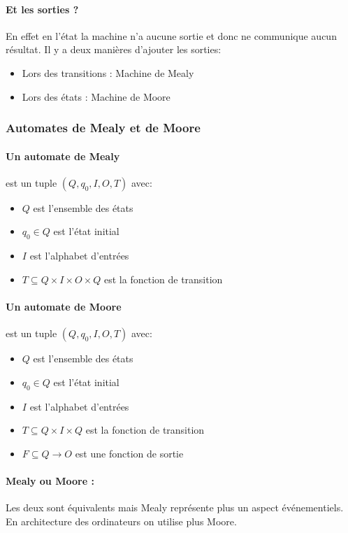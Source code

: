 \documentclass[10pt,a4paper,twoside]{article}
\begin{document}
\paragraph{Et les sorties ?} En effet en l'état la machine n'a aucune sortie et donc ne communique aucun résultat. Il y a deux manières d'ajouter les sorties:
\begin{itemize}
\item Lors des transitions : Machine de Mealy
\item Lors des états : Machine de Moore
\end{itemize}


\subsubsection{Automates de Mealy et de Moore}
\paragraph{Un automate de Mealy} est un tuple  $(Q,q_{0},I,O,T)$ avec:
\begin{itemize}
\item $Q$ est l'ensemble des états
\item $q_{0} \in Q$ est l'état initial
\item $I$ est l'alphabet d'entrées
\item $T \subseteq Q\times I\times O \times Q$ est la fonction de transition
\end{itemize}

\paragraph{Un automate de Moore} est un tuple  $(Q,q_{0},I,O,T)$ avec:
\begin{itemize}
\item $Q$ est l'ensemble des états
\item $q_{0} \in Q$ est l'état initial
\item $I$ est l'alphabet d'entrées
\item $T \subseteq Q\times I\times Q$ est la fonction de transition
\item $F \subseteq Q \rightarrow O$ est une fonction de sortie
\end{itemize}

\paragraph{Mealy ou Moore :} Les deux sont équivalents mais Mealy représente plus un aspect événementiels. En architecture des ordinateurs on utilise plus Moore.
\end{document}
